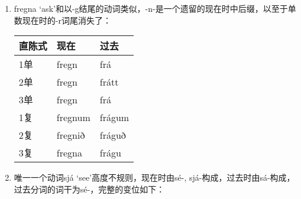 \begin{enumerate}
    \item
          fregna `ask'和以-g结尾的动词类似，-n-是一个遗留的现在时中后缀，以至于单数现在时的-r词尾消失了：
          \begin{longtable}{lll}
              \toprule
              直陈式 & 现在    & 过去   \\
              \midrule
              \endhead
              \bottomrule
              \endfoot
              1单    & fregn   & frá    \\
              2单    & fregn   & frátt  \\
              3单    & fregn   & frá    \\
              1复    & fregnum & frágum \\
              2复    & fregnið & fráguð \\
              3复    & fregna  & frágu  \\
          \end{longtable}

    \item
          唯一一个动词sjá `see‌'高度不规则，现在时由sé-, sjá-构成，过去时由sá-构成，过去分词的词干为sé-，完整的变位如下：


\end{enumerate}
